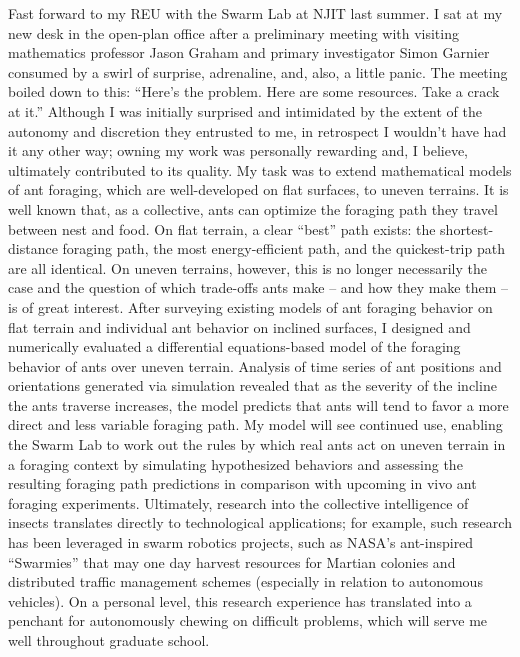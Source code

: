 \documentclass[12pt]{book}
\begin{document}
Fast forward to my REU with the Swarm Lab at NJIT last summer. I sat at my new desk in the open-plan office after a preliminary meeting with visiting mathematics professor Jason Graham and primary investigator Simon Garnier consumed by a swirl of surprise, adrenaline, and, also, a little panic. The meeting boiled down to this: ``Here's the problem. Here are some resources. Take a crack at it.'' Although I was initially surprised and intimidated by the extent of the autonomy and discretion they entrusted to me, in retrospect I wouldn't have had it any other way; owning my work was personally rewarding and, I believe, ultimately contributed to its quality. My task was to extend mathematical models of ant foraging, which are well-developed on flat surfaces, to uneven terrains. It is well known that, as a collective, ants can optimize the foraging path they travel between nest and food. On flat terrain, a clear ``best'' path exists: the shortest-distance foraging path, the most energy-efficient path, and the quickest-trip path are all identical. On uneven terrains, however, this is no longer necessarily the case and the question of which trade-offs ants make -- and how they make them -- is of great interest. After surveying existing models of ant foraging behavior on flat terrain and individual ant behavior on inclined surfaces, I designed and numerically evaluated a differential equations-based model of the foraging behavior of ants over uneven terrain. Analysis of time series of ant positions and orientations generated via simulation revealed that as the severity of the incline the ants traverse increases, the model predicts that ants will tend to favor a more direct and less variable foraging path. 
My model will see continued use, enabling the Swarm Lab to work out the rules by which real ants act on uneven terrain in a foraging context by simulating hypothesized behaviors and assessing the resulting foraging path predictions in comparison with upcoming in vivo ant foraging experiments. Ultimately, research into the collective intelligence of insects translates directly to technological applications; for example, such research has been leveraged in swarm robotics projects, such as NASA's ant-inspired ``Swarmies'' that may one day harvest resources for Martian colonies and distributed traffic management schemes (especially in relation to autonomous vehicles). On a personal level, this research experience has translated into a penchant for autonomously chewing on difficult problems, which will serve me well throughout graduate school.
\end{document}

